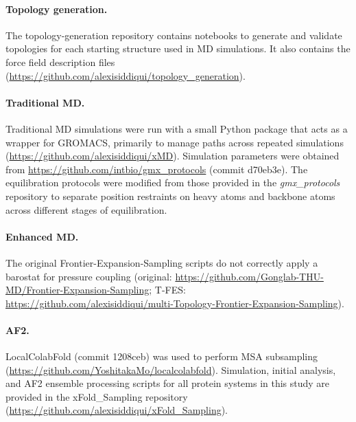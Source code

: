 \paragraph{Topology generation.}
The topology-generation repository contains notebooks to generate and validate topologies for each starting structure used in MD simulations. It also contains the force field description files (\url{https://github.com/alexisiddiqui/topology_generation}).

\paragraph{Traditional MD.}
Traditional MD simulations were run with a small Python package that acts as a wrapper for GROMACS, primarily to manage paths across repeated simulations (\url{https://github.com/alexisiddiqui/xMD}). Simulation parameters were obtained from \url{https://github.com/intbio/gmx_protocols} (commit d70eb3e). The equilibration protocols were modified from those provided in the \textit{gmx\_protocols} repository to separate position restraints on heavy atoms and backbone atoms across different stages of equilibration.

\paragraph{Enhanced MD.}
The original Frontier-Expansion-Sampling scripts do not correctly apply a barostat for pressure coupling (original: \url{https://github.com/Gonglab-THU-MD/Frontier-Expansion-Sampling}; T-FES: \url{https://github.com/alexisiddiqui/multi-Topology-Frontier-Expansion-Sampling}).

\paragraph{AF2.}
LocalColabFold (commit 1208ceb) was used to perform MSA subsampling (\url{https://github.com/YoshitakaMo/localcolabfold}). Simulation, initial analysis, and AF2 ensemble processing scripts for all protein systems in this study are provided in the xFold\_Sampling repository (\url{https://github.com/alexisiddiqui/xFold_Sampling}).
